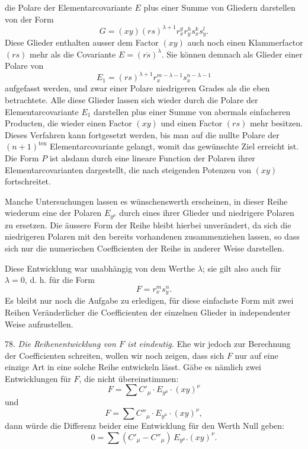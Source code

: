 die Polare der Elementarcovariante $E$ plus einer Summe von Gliedern darstellen von der Form
\[ G = (xy)(rs)^{\lambda+1} r_x^g r_y^h s_x^k s_y^l. \]
Diese Glieder enthalten ausser dem Factor $(xy)$ auch noch einen Klammerfactor $(rs)$ mehr als die Covariante $E = (\overline{rs})^\lambda$. Sie können demnach als Glieder einer Polare von
\[ E_1 = (rs)^{\lambda+1} r_x^{m-\lambda-1} s_x^{n-\lambda-1} \]
aufgefasst werden, und zwar einer Polare niedrigeren Grades als die eben betrachtete. Alle diese Glieder lassen sich wieder durch die Polare der Elementarcovariante $E_1$ darstellen plus einer Summe von abermals einfacheren Producten, die wieder einen Factor $(xy)$ und einen Factor $(rs)$ mehr besitzen. Dieses Verfahren kann fortgesetzt werden, bis man auf die nullte Polare der $(n+1)^{\text{ten}}$ Elementarcovariante gelangt, womit das gewünschte Ziel erreicht ist. Die Form $P$ ist alsdann durch eine lineare Function der Polaren ihrer Elementarcovarianten dargestellt, die nach steigenden Potenzen von $(xy)$ fortschreitet.

Manche Untersuchungen lassen es wünschenswerth erscheinen, in dieser Reihe wiederum eine der Polaren $E_{y^\mu}$ durch eines ihrer Glieder und niedrigere Polaren zu ersetzen. Die äussere Form der Reihe bleibt hierbei unverändert, da sich die niedrigeren Polaren mit den bereits vorhandenen zusammenziehen lassen, so dass sich nur die numerischen Coefficienten der Reihe in anderer Weise darstellen.

Diese Entwicklung war unabhängig von dem Werthe $\lambda$; sie gilt also auch für $\lambda = 0$, d. h. für die Form
\[ F = r_x^m s_y^n. \]
Es bleibt nur noch die Aufgabe zu erledigen, für diese einfachste Form mit zwei Reihen Veränderlicher die Coefficienten der einzelnen Glieder in independenter Weise aufzustellen.

78. \textit{Die Reihenentwicklung von $F$ ist eindeutig.} Ehe wir jedoch zur Berechnung der Coefficienten schreiten, wollen wir noch zeigen, dass sich $F$ nur auf eine einzige Art in eine solche Reihe entwickeln lässt. Gäbe es nämlich zwei Entwicklungen für $F$, die nicht übereinstimmen:
\[ F = \sum C'_\mu \cdot E_{y^\mu} \cdot (xy)^\nu \]
und
\[ F = \sum C''_\mu \cdot E_{y^\mu} \cdot (xy)^\nu, \]
dann würde die Differenz beider eine Entwicklung für den Werth Null geben:
\[ 0 = \sum (C'_\mu - C''_\mu)\, E_{y^\mu} . (xy)^\nu . \]


